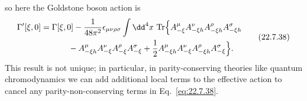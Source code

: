 so here the Goldstone boson action is
\begin{equation}
 \begin{aligned}
 \Gamma'[\xi,0]
 ={}&\Gamma[\xi,0]
 -\frac{1}{48\pi^2}\epsilon_{\mu\nu\rho\sigma}\int \dd^4x\,
 \operatorname{Tr}\Bigl\{
 A_{-\xi}^\mu A_{-\xi h}^\nu A_{-\xi h}^\rho A_{-\xi h}^\sigma
 \\
 &\qquad{}
 -A_{-\xi h}^\mu A_{-\xi}^\nu A_{-\xi}^\rho A_{-\xi}^\sigma
 +\frac{1}{2}
 A_{-\xi h}^\mu A_{-\xi}^\nu A_{-\xi h}^\rho A_{-\xi}^\sigma
 \Bigr\}.
 \end{aligned}
 \tag{22.7.38}\label{eq:22.7.38}
\end{equation}
This result is not unique; in particular, in parity-conserving theories
like quantum chromodynamics we can add additional local terms to the
effective action to cancel any parity-non-conserving terms in
Eq.~\eqref{eq:22.7.38}.
